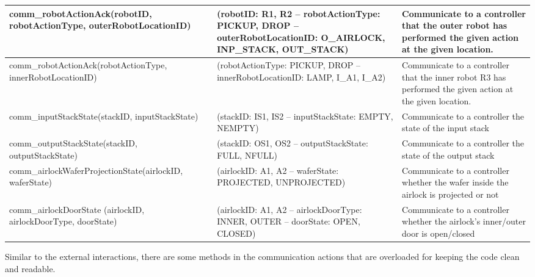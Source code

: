 \begin{longtable}{| p{4.3cm}| p{4.3cm}| p{4.3cm}|}
\hline
comm_robotActionAck(robotID, robotActionType, outerRobotLocationID) & (robotID: R1, R2 -- robotActionType: PICKUP, DROP -- outerRobotLocationID: O_AIRLOCK, INP_STACK, OUT_STACK) & Communicate to a controller that the outer robot has performed the given action at the given location. \\ \hline
comm_robotActionAck(robotActionType, innerRobotLocationID) & (robotActionType: PICKUP, DROP -- innerRobotLocationID: LAMP, I_A1, I_A2) & Communicate to a controller that the inner robot R3 has performed the given action at the given location. \\ \hline
comm_inputStackState(stackID, inputStackState) & (stackID: IS1, IS2 -- inputStackState: EMPTY, NEMPTY) & Communicate to a controller the state of the input stack\\ \hline
comm_outputStackState(stackID, outputStackState) & (stackID: OS1, OS2 -- outputStackState: FULL, NFULL) & Communicate to a controller the state of the output stack\\ \hline
comm_airlockWaferProjectionState(airlockID, waferState) & (airlockID: A1, A2 -- waferState: PROJECTED, UNPROJECTED) & Communicate to a controller whether the wafer inside the airlock is projected or not\\ \hline
comm_airlockDoorState (airlockID, airlockDoorType, doorState) & (airlockID: A1, A2 -- airlockDoorType: INNER, OUTER -- doorState: OPEN, CLOSED) & Communicate to a controller whether the airlock's inner/outer door is open/closed\\ \hline

\end{longtable}

Similar to the external interactions, there are some methods in the communication actions that are overloaded for keeping the code clean and readable.


